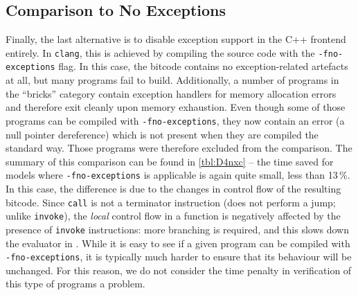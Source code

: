 \subsection{Comparison to No
Exceptions}\label{comparison-to-no-exceptions}

Finally, the last alternative is to disable exception support in the C++
frontend entirely. In \texttt{clang}, this is achieved by compiling the
source code with the \texttt{-fno-exceptions} flag. In this case, the
\llvm{} bitcode contains no exception-related artefacts at all, but many
programs fail to build. Additionally, a number of programs in the
``bricks'' category contain exception handlers for memory allocation
errors and therefore exit cleanly upon memory exhaustion. Even
though some of those programs can be compiled with
\texttt{-fno-exceptions}, they now contain an error (a null pointer
dereference) which is not present when they are compiled the standard
way. Those programs were therefore excluded from the comparison. The
summary of this comparison can be found in \autoref{tbl:D4nxc} -- the
time saved for models where \texttt{-fno-exceptions} is applicable is
again quite small, less than 13\,\%. In this case, the difference is due
to the changes in control flow of the resulting \llvm{} bitcode. Since
\texttt{call} is not a terminator instruction (does not perform a jump; unlike
\texttt{invoke}),
the \emph{local} control flow in a function is negatively affected by
the presence of \texttt{invoke} instructions: more branching is
required, and this slows down the evaluator in \divm{}. While it is easy to
see if a given program can be compiled with \texttt{-fno-exceptions}, it
is typically much harder to ensure that its behaviour will be unchanged.
For this reason, we do not consider the time penalty in verification of
this type of programs a problem.

